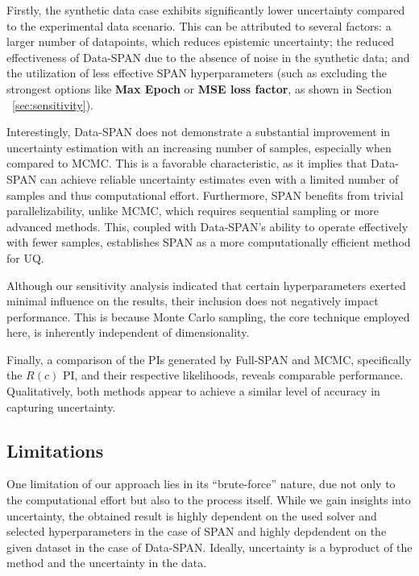 Firstly, the synthetic data case exhibits significantly lower uncertainty compared to the experimental data scenario. This can be attributed to several factors: a larger number of datapoints, which reduces epistemic uncertainty; the reduced effectiveness of Data-SPAN due to the absence of noise in the synthetic data; and the utilization of less effective SPAN hyperparameters (such as excluding the strongest options like \textbf{Max Epoch} or \textbf{MSE loss factor}, as shown in Section ~\vref{sec:sensitivity}).

Interestingly, Data-SPAN does not demonstrate a substantial improvement in uncertainty estimation with an increasing number of samples, especially when compared to MCMC. This is a favorable characteristic, as it implies that Data-SPAN can achieve reliable uncertainty estimates even with a limited number of samples and thus computational effort. Furthermore, SPAN benefits from trivial parallelizability, unlike MCMC, which requires sequential sampling or more advanced methods. This, coupled with Data-SPAN's ability to operate effectively with fewer samples, establishes SPAN as a more computationally efficient method for UQ.

Although our sensitivity analysis indicated that certain hyperparameters exerted minimal influence on the results, their inclusion does not negatively impact performance. This is because Monte Carlo sampling, the core technique employed here, is inherently independent of dimensionality.

Finally, a comparison of the PIs generated by Full-SPAN and MCMC, specifically the $R(c)$ PI, and their respective likelihoods, reveals comparable performance. Qualitatively, both methods appear to achieve a similar level of accuracy in capturing uncertainty.




\subsection{Limitations}
One limitation of our approach lies in its ``brute-force'' nature, due not only to the computational effort but also to the process itself. While we gain insights into uncertainty, the obtained result is highly dependent on the used solver and selected hyperparameters in the case of SPAN and highly depdendent on the given dataset in the case of Data-SPAN. Ideally, uncertainty is a byproduct of the method and the uncertainty in the data.

